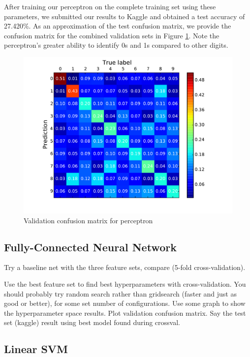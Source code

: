 \documentclass{acm_proc_article-sp}
\begin{document}
After training our perceptron on the complete training set using these parameters, we submitted our results to Kaggle and obtained a test accuracy of 27.420\%. As an approximation of the test confusion matrix, we provide the confusion matrix for the combined validation sets in Figure \ref{fig:perc-confusion}. Note the perceptron's greater ability to identify 0s and 1s compared to other digits.
\begin{figure}[h!]
	\centering
	\includegraphics[width=\linewidth]{perceptron_confusion}
  	\caption{Validation confusion matrix for perceptron}
  	\label{fig:perc-confusion}
\end{figure}

\subsection{Fully-Connected Neural Network}
Try a baseline net with the three feature sets, compare (5-fold cross-validation).

Use the best feature set to find best hyperparameters with cross-validation. You should probably try random search rather than gridsearch (faster and just as good or better), for some set number of configurations. Use some graph to show the hyperparameter space results. Plot validation confusion matrix. Say the test set (kaggle) result using best model found during crossval.

\subsection{Linear SVM}
\end{document}
